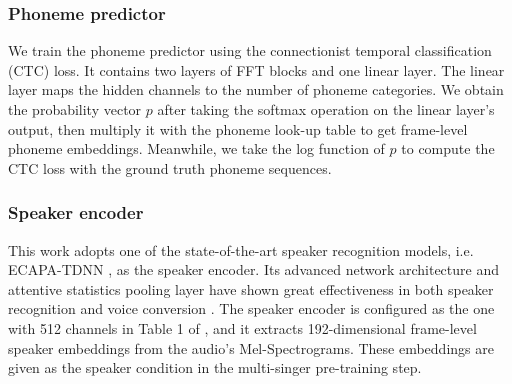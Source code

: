 \subsubsection{Phoneme predictor}
We train the phoneme predictor using the connectionist temporal classification (CTC) \cite{graves2006connectionist} loss. 
It contains two layers of FFT blocks and one linear layer.
The linear layer maps the hidden channels to the number of phoneme categories. 
We obtain the probability vector $p$ after taking the softmax operation on the linear layer's output, then multiply it with the phoneme look-up table to get frame-level phoneme embeddings.
Meanwhile, we take the log function of $p$ to compute the CTC loss with the ground truth phoneme sequences. 

\subsubsection{Speaker encoder}
This work adopts one of the state-of-the-art speaker recognition models, i.e. ECAPA-TDNN \cite{desplanques2020ecapa}, as the speaker encoder. Its advanced network architecture and attentive statistics pooling layer have shown great effectiveness in both speaker recognition \cite{desplanques2020ecapa} and voice conversion \cite{guo2022improving,li2022hierarchical}. The speaker encoder is configured as the one with 512 channels in Table 1 of \cite{desplanques2020ecapa}, and it extracts 192-dimensional frame-level speaker embeddings from the audio's Mel-Spectrograms. These embeddings are given as the speaker condition in the multi-singer pre-training step. 

